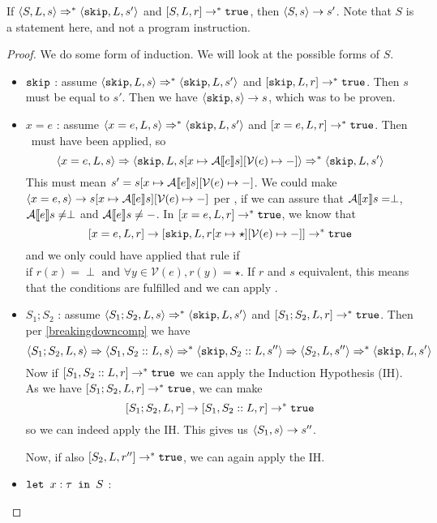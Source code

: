\begin{lemma}
\label{sosimpns}
If $\langle S, L, s \rangle \Rightarrow ^{*} \langle \texttt{skip}, L, s' \rangle$ and $[ S, L, r ] \to^{*} \texttt{true}$, then $\langle S, s \rangle \to s'$. Note that $S$ is a statement here, and not a program instruction. 
\end{lemma}
\begin{proof}
We do some form of induction. We will look at the possible forms of $S$.
\begin{itemize}[noitemsep]
\item $\texttt{skip}$ : assume $\langle \texttt{skip}, L, s \rangle \Rightarrow ^{*} \langle \texttt{skip}, L, s' \rangle$ and $[ \texttt{skip}, L, r ] \to^{*} \texttt{true}$. Then $s$ must be equal to $s'$. Then we have $\langle \texttt{skip}, s \rangle \to s$, which was to be proven. 
\item $x = e$ : assume $\langle x=e, L, s \rangle \Rightarrow^{*} \langle \texttt{skip}, L, s' \rangle$ and $[ x=e, L, r ] \to^{*} \texttt{true}$. Then \asssos ~must have been applied, so 
$$\langle x=e, L, s \rangle \Rightarrow \langle \texttt{skip}, L, s[x \mapsto \mathcal{A} \llbracket e \rrbracket s][\mathcal{V}(e)\mapsto-] \rangle \Rightarrow^{*} \langle \texttt{skip}, L, s' \rangle$$
This must mean $s' = s[x \mapsto \mathcal{A} \llbracket e \rrbracket s][\mathcal{V}(e)\mapsto-]$. We could make $\langle x=e, s \rangle \to s[x \mapsto \mathcal{A} \llbracket e \rrbracket s][\mathcal{V}(e)\mapsto-]$ per \assns, if we can assure that $\mathcal{A} \llbracket x \rrbracket s = \perp$, $\mathcal{A} \llbracket e \rrbracket s \neq \perp$ and $\mathcal{A} \llbracket e \rrbracket s \neq -$. In $[ x=e, L, r ] \to^{*} \texttt{true}$, we know that 
$$[ x=e, L, r ] \to [ \texttt{skip}, L, r[x \mapsto \star][\mathcal{V}(e)\mapsto-] ] \to^{*} \texttt{true}$$ 
and we only could have applied that rule if $\textrm{if }r(x) = \perp \textrm{ and } \forall y \in \mathcal{V}(e), r(y) = \star$. If $r$ and $s$ equivalent, this means that the conditions are fulfilled and we can apply \assns. 
\item $S_1; S_2$ : assume $\langle S_1; S_2, L, s \rangle \Rightarrow^{*} \langle \texttt{skip}, L, s' \rangle$ and $[ S_1; S_2, L, r ] \to^{*} \texttt{true}$. Then per \ref{breakingdowncomp} we have 
$$\langle S_1; S_2, L, s \rangle \Rightarrow \langle S_1, S_2::L, s \rangle \Rightarrow ^{*} \langle \texttt{skip}, S_2::L, s'' \rangle \Rightarrow \langle S_2, L, s'' \rangle \Rightarrow ^{*} \langle \texttt{skip}, L, s' \rangle$$
Now if $[ S_1, S_2::L, r ] \to ^{*} \texttt{true}$ we can apply the Induction Hypothesis (IH). 
As we have $[ S_1; S_2, L, r ] \to^{*} \texttt{true}$, we can make
$$[ S_1; S_2, L, r ] \to [ S_1, S_2::L, r ] \to ^{*} \texttt{true}$$
so we can indeed apply the IH. 
This gives us $\langle S_1, s \rangle \to s''$. 

Now, if also $[ S_2, L, r'' ] \to ^{*} \texttt{true}$, we can again apply the IH. 
\item $\texttt{let }x : \tau \texttt{ in } S$ :
\end{itemize}
\end{proof}

